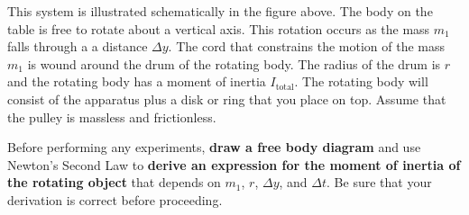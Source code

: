 \documentclass[11pt,letterpaper]{article}
\begin{document}
This system is illustrated schematically in the figure above.  The body on the table is free to rotate about a vertical axis. This rotation occurs as the mass $m_1$ falls through a a distance $\Delta{y}$. The cord that constrains the motion of the mass $m_1$ is wound around the drum of the rotating body. The radius of the drum is $r$ and the rotating body has a moment of inertia $I_{\mbox{total}}$. The rotating body will consist of the apparatus plus a disk or ring that you place on top. Assume that the pulley is massless and frictionless.

Before performing any experiments, \textbf{draw a free body diagram} and use Newton's Second Law to \textbf{derive an expression for the moment of inertia of the rotating object} that depends on $m_1$, $r$, $\Delta y$, and $\Delta t$. Be sure that your derivation is correct before proceeding.
\end{document}
